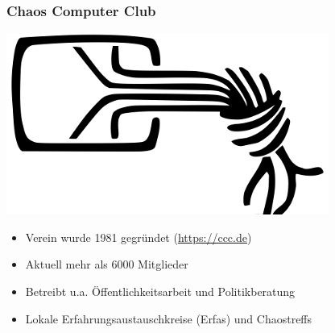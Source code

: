 \documentclass[12pt]{beamer}
\begin{document}
\begin{frame}
\begin{figure}
  \end{figure}
\end{frame}

\begin{frame}
	\frametitle{Chaos Computer Club}
	\begin{center}
		\includegraphics[height=0.2\textheight]{img/chaosknoten.png}
	\end{center}	
	\begin{itemize}
		\item Verein wurde 1981 gegründet (\url{https://ccc.de})          
		\item Aktuell mehr als 6000 Mitglieder
		\item Betreibt u.a. Öffentlichkeitsarbeit und Politikberatung      
		\item Lokale Erfahrungsaustauschkreise (Erfas) und Chaostreffs
	\end{itemize}
\end{frame}
\end{document}
